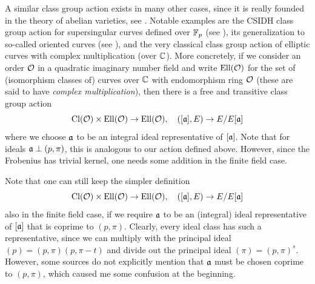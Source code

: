 A similar class group action exists in many other cases, since it is really founded in the theory of abelian varieties, see \cite{class_group_action_waterhouse}.
Notable examples are the CSIDH class group action for supersingular curves defined over $\mathbb{F}_p$ (see \cite{csidh}), its generalization to so-called oriented curves (see \cite{osidh}), and the very classical class group action of elliptic curves with complex multiplication (over $\mathbb{C}$).
More concretely, if we consider an order $\mathcal{O}$ in a quadratic imaginary number field and write $\mathrm{Ell}(\mathcal{O})$ for the set of (isomorphism classes of) curves over $\mathbb{C}$ with endomorphism ring $\mathcal{O}$ (these are said to have \emph{complex multiplication}), then there is a free and transitive class group action
\begin{equation*}
    \mathrm{Cl}(\mathcal{O}) \times \mathrm{Ell}(\mathcal{O}) \to \mathrm{Ell}(\mathcal{O}), \quad ([\mathfrak{a}], E) \to E/E[\mathfrak{a}]
\end{equation*}
where we choose $\mathfrak{a}$ to be an integral ideal representative of $[\mathfrak{a}]$.
Note that for ideals $\mathfrak{a} \perp (p, \pi)$, this is analogous to our action defined above.
However, since the Frobenius has trivial kernel, one needs some addition in the finite field case.

Note that one can still keep the simpler definition
\begin{equation*}
    \mathrm{Cl}(\mathcal{O}) \times \mathrm{Ell}(\mathcal{O}) \to \mathrm{Ell}(\mathcal{O}), \quad ([\mathfrak{a}], E) \to E/E[\mathfrak{a}]
\end{equation*}
also in the finite field case, if we require $\mathfrak{a}$ to be an (integral) ideal representative of $[\mathfrak{a}]$ that is coprime to $(p, \pi)$.
Clearly, every ideal class has such a representative, since we can multiply with the principal ideal $(p) = (p, \pi)(p, \pi - t)$ and divide out the principal ideal $(\pi) = (p, \pi)^s$.
However, some sources do not explicitly mention that $\mathfrak{a}$ must be chosen coprime to $(p, \pi)$, which caused me some confusion at the beginning.

